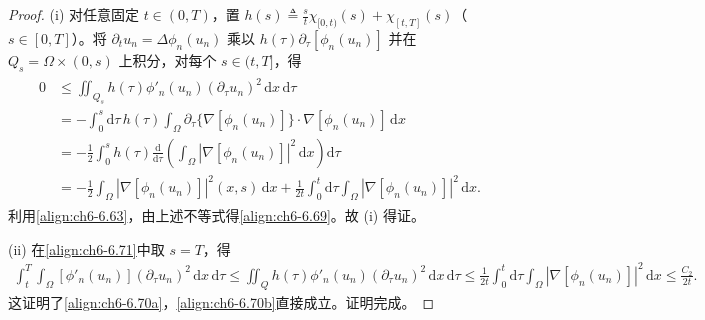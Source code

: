 \documentclass[../../main.tex]{subfiles}%
\begin{document}
\begin{proof}
(i) 对任意固定 $t\in(0,T)$，置 $h(s)\triangleq\frac{s}{t}\chi_{[0,t)}(s)+\chi_{[t,T]}(s)$（$s\in[0,T]$）。将 $\partial_tu_n=\Delta\phi_n(u_n)$ 乘以 $h(\tau)\partial_\tau[\phi_n(u_n)]$ 并在 $Q_s=\Omega\times(0,s)$ 上积分，对每个 $s\in(t,T]$，得
\begin{align}
\label{align:ch6-6.71}
\begin{aligned}
0&\leqslant\iint_{Q_s}h(\tau)\phi'_n(u_n)(\partial_\tau u_n)^2\,\mathrm{d}x\,\mathrm{d}\tau\\
&=-\int_0^s\mathrm{d}\tau\,h(\tau)\int_\Omega\partial_\tau\{\nabla[\phi_n(u_n)]\}\cdot\nabla[\phi_n(u_n)]\,\mathrm{d}x\\
&=-\frac{1}{2}\int_0^sh(\tau)\frac{\mathrm{d}}{\mathrm{d}\tau}\left(\int_\Omega|\nabla[\phi_n(u_n)]|^2\,\mathrm{d}x\right)\mathrm{d}\tau\\
&=-\frac{1}{2}\int_\Omega|\nabla[\phi_n(u_n)]|^2(x,s)\,\mathrm{d}x
+\frac{1}{2t}\int_0^t\mathrm{d}\tau\int_\Omega|\nabla[\phi_n(u_n)]|^2\,\mathrm{d}x.
\end{aligned}
\end{align}
利用\eqref{align:ch6-6.63}，由上述不等式得\eqref{align:ch6-6.69}。故 (i) 得证。

(ii) 在\eqref{align:ch6-6.71}中取 $s=T$，得
\begin{align*}
\int_t^T\int_\Omega[\phi'_n(u_n)](\partial_\tau u_n)^2\,\mathrm{d}x\,\mathrm{d}\tau
\leqslant\iint_Qh(\tau)\phi'_n(u_n)(\partial_\tau u_n)^2\,\mathrm{d}x\,\mathrm{d}\tau
\leqslant\frac{1}{2t}\int_0^t\mathrm{d}\tau\int_\Omega|\nabla[\phi_n(u_n)]|^2\,\mathrm{d}x
\leqslant\frac{C_2}{2t}.
\end{align*}
这证明了\eqref{align:ch6-6.70a}，\eqref{align:ch6-6.70b}直接成立。证明完成。
\end{proof}
\end{document}
